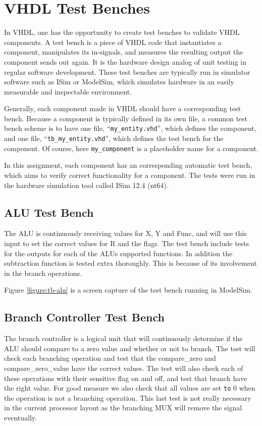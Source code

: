 \section{VHDL Test Benches}

In VHDL, one has the opportunity to create test benches to validate VHDL components.
A test bench is a piece of VHDL code that instantiates a component, manipulates its in-signals, and measures the resulting output the component sends out again.
It is the hardware design analog of unit testing in regular software development.
These test benches are typically run in simulator software such as ISim or ModelSim, which simulates hardware in an easily measurable and inspectable environment.

Generally, each component made in VHDL should have a corresponding test bench.
Because a component is typically defined in its own file, a common test bench scheme is to have one file, ``\texttt{my\_entity.vhd}'', which defines the component, and one file, ``\texttt{tb\_my\_entity.vhd}'', which defines the test bench for the component.
Of course, here \texttt{my\_component} is a placeholder name for a component.

In this assignment, each component has an corresponding automatic test bench, which aims to verify correct functionality for a component.
The tests were run in the hardware simulation tool called ISim 12.4 (nt64).

\subsection{ALU Test Bench}

The ALU is continuously receiving values for X, Y and Func, and will use this input to set the correct values for R and the flags.
The test bench include tests for the outputs for each of the ALUs supported functions.
In addition the subtraction function is tested extra thoroughly.
This is because of its involvement in the branch operations.

Figure \vref{figure:tb-alu} is a screen capture of the test bench running in ModelSim.

\subsection{Branch Controller Test Bench}

The branch controller is a logical unit that will continuously determine if the ALU should compare to a zero value and whether or not to branch.
The test will check each branching operation and test that the compare\_zero and compare\_zero\_value have the correct values.
The test will also check each of these operations with their sensitive flag on and off, and test that branch have the right value.
For good measure we also check that all values are set \texttt{to} 0 when the operation is not a branching operation.
This last test is not really necessary in the current processor layout as the branching MUX will remove the signal eventually.


